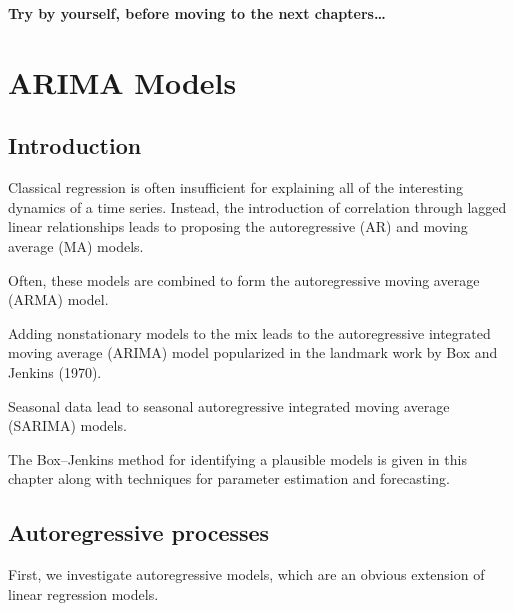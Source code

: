 \documentclass[
paper=128mm:96mm, %
fontsize=9.5pt, %
pagesize, %
parskip=half-, %
]{scrartcl} %
\theoremstyle{mythmstyle} %
\begin{document}
\textbf{\color{red}Try by yourself, before moving to the next chapters\dots}

\clearpage




\section{ARIMA Models}







\subsection{Introduction}
Classical regression is often insufficient for explaining all of the interesting dynamics of a time series. Instead, the introduction of correlation through lagged linear relationships leads to proposing the autoregressive (AR) and moving average (MA) models. 

Often, these models are combined to form the autoregressive moving average (ARMA) model. 

Adding nonstationary models to the mix leads to the autoregressive integrated moving average (ARIMA) model popularized in the landmark work by Box and Jenkins (1970). 

Seasonal data lead to seasonal autoregressive integrated moving average (SARIMA) models. 

The Box--Jenkins method for identifying a plausible models is given in this chapter along with techniques for parameter estimation and forecasting.


\subsection{Autoregressive processes}


First, we investigate autoregressive models, which are an obvious extension of linear regression models.
\end{document}
